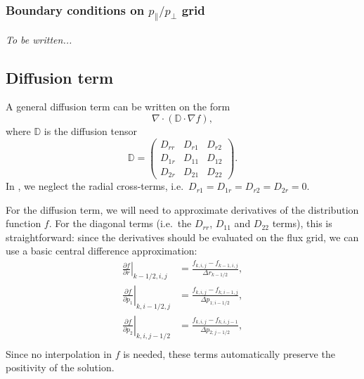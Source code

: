 \documentclass{notes}
\begin{document}
    \subsubsection{Boundary conditions on $p_\parallel / p_\perp$ grid}
    \emph{To be written...}

    \subsection{Diffusion term}\label{sec:diffusion}
    A general diffusion term can be written on the form
    \begin{equation*}
        \nabla\cdot\left( \mathbb{D}\cdot\nabla f \right),
    \end{equation*}
    where $\mathbb{D}$ is the diffusion tensor
    \begin{equation*}
        \mathbb{D} = \begin{pmatrix}
            D_{rr} & D_{r1} & D_{r2} \\
            D_{1r} & D_{11} & D_{12} \\
            D_{2r} & D_{21} & D_{22}
        \end{pmatrix}.
    \end{equation*}
    In \DREAM, we neglect the radial cross-terms, i.e.\
    $D_{r1} = D_{1r} = D_{r2} = D_{2r} = 0$.

    For the diffusion term, we will need to approximate derivatives of the
    distribution function $f$. For the diagonal terms (i.e.\ the $D_{rr}$,
    $D_{11}$ and $D_{22}$ terms), this is straightforward: since the derivatives
    should be evaluated on the flux grid, we can use a basic central difference
    approximation:
    \begin{align}
        \left.\frac{\partial f}{\partial r}\right|_{k-1/2,i,j} &=
            \frac{f_{k,i,j} - f_{k-1,i,j}}{\Delta r_{k-1/2}},\\
        \left.\frac{\partial f}{\partial p_1}\right|_{k,i-1/2,j} &=
            \frac{f_{k,i,j} - f_{k,i-1,j}}{\Delta p_{1; i-1/2}},\\
        \left.\frac{\partial f}{\partial p_2}\right|_{k,i,j-1/2} &=
            \frac{f_{k,i,j} - f_{k,i,j-1}}{\Delta p_{2; j-1/2}},\\
    \end{align}
    Since no interpolation in $f$ is needed, these terms automatically preserve
    the positivity of the solution.
\end{document}
